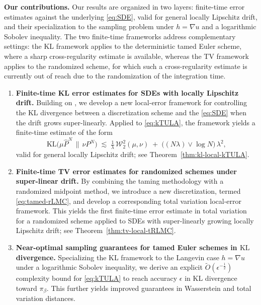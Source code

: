 \documentclass[11pt,a4paper,reqno]{amsart}
\theoremstyle{plain}
\theoremstyle{definition}
\theoremstyle{remark}
\newcommand{\KL}{\mathrm{KL}}
\begin{document}
\medskip
\textbf{Our contributions.} Our results are organized in two layers: finite-time error estimates against the underlying \eqref{eq:SDE}, valid for general locally Lipschitz drift, and their specialization to the sampling problem under $h = \nabla u$ and a logarithmic Sobolev inequality. The two finite-time frameworks address complementary settings: the KL framework applies to the deterministic tamed Euler scheme, where a sharp cross-regularity estimate is available, whereas the TV framework applies to the randomized scheme, for which such a cross-regularity estimate is currently out of reach due to the randomization of the integration time.
\begin{enumerate}
    \item[(i)] \textbf{Finite-time KL error estimates for SDEs with locally Lipschitz drift.}
    Building on \cite{chewi2024local}, we develop a new local-error framework for controlling the KL divergence between a discretization scheme and the \eqref{eq:SDE} when the drift grows super-linearly. Applied to \eqref{eq:kTULA}, the framework yields a finite-time estimate of the form
    \[
        \KL\!\bigl(\mu\widehat{P}^{N}\,\big\|\,\nu P^{N}\bigr)
        \;\lesssim\;
        \tfrac{1}{\lambda}\,\mathcal{W}_2^2(\mu,\nu)
        \;+\;\bigl((N\lambda)\vee\log N\bigr)\,\lambda^{2},
    \]
    valid for general locally Lipschitz drift; see Theorem~\ref{thm:kl-local-kTULA}.

    \item[(ii)] \textbf{Finite-time TV error estimates for randomized schemes under super-linear drift.}
    By combining the taming methodology with a randomized midpoint method, we introduce a new discretization, termed \ref{eq:tamed-rLMC}, and develop a corresponding total variation local-error framework. This yields the first finite-time error estimate in total variation for a randomized scheme applied to SDEs with super-linearly growing locally Lipschitz drift; see Theorem~\ref{thm:tv-local-tRLMC}.

    \item[(iii)] \textbf{Near-optimal sampling guarantees for tamed Euler schemes in $\KL$ divergence.}
    Specializing the KL framework to the Langevin case $h = \nabla u$ under a logarithmic Sobolev inequality, we derive an explicit $\tilde{O}(\epsilon^{-\frac{1}{2}})$ complexity bound for \ref{eq:kTULA} to reach accuracy $\epsilon$ in KL divergence toward $\pi_\beta$. This further yields improved guarantees in Wasserstein and total variation distances.


\end{enumerate}
\end{document}
